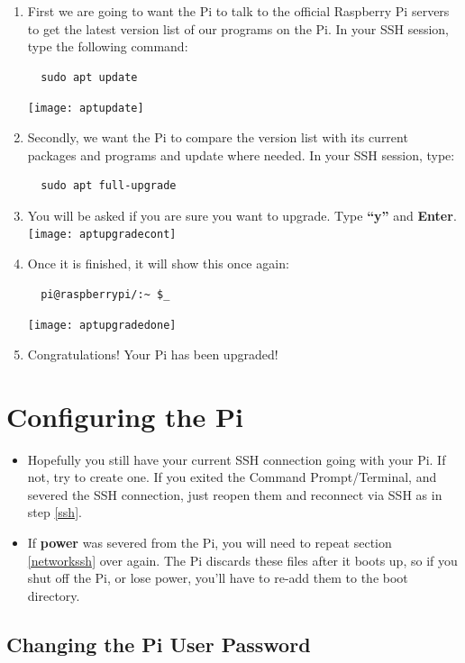 \documentclass{article}
\begin{document}
\begin{enumerate}
  \item First we are going to want the Pi to talk to the official Raspberry Pi servers to get the latest version list of our programs on the Pi. In your SSH session, type the following command:
  \begin{lstlisting} 
  sudo apt update
  \end{lstlisting}
  \texttt{[image: aptupdate]}
  \item Secondly, we want the Pi to compare the version list with its current packages and programs and update where needed. In your SSH session, type:
  \begin{lstlisting}
  sudo apt full-upgrade
  \end{lstlisting}
  \item You will be asked if you are sure you want to upgrade. Type \textbf{``y''} and \textbf{Enter}.
  \newline
  \newline
  \texttt{[image: aptupgradecont]}
  \item Once it is finished, it will show this once again:
  \begin{lstlisting}
  pi@raspberrypi/:~ $_ 
  \end{lstlisting}
  \texttt{[image: aptupgradedone]}
  \item Congratulations! Your Pi has been upgraded!
\end{enumerate}

\section{Configuring the Pi}

\begin{itemize}
  \item Hopefully you still have your current SSH connection going with your Pi. If not, try to create one. If you exited the Command Prompt/Terminal, and severed the SSH connection, just reopen them and reconnect via SSH as in step \ref{ssh}.
  \item If \textbf{power} was severed from the Pi, you will need to repeat section \ref{networkssh} over again. The Pi discards these files after it boots up, so if you shut off the Pi, or lose power, you'll have to re-add them to the boot directory.
\end{itemize}

\subsection{Changing the Pi User Password}
\end{document}
